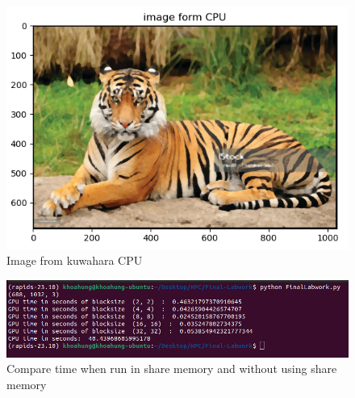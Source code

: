 \documentclass{article}
\begin{document}
\begin{figure}[b]
\begin{center}
   \includegraphics[scale=0.7]{image_from_cpu.png}
\end{center}
\caption{Image from kuwahara CPU}
\end{figure}

\begin{figure}[b]
\begin{center}
   \includegraphics[scale=0.5]{result_process.png}
\end{center}
\caption{Compare time when run in share memory and without using share memory }
\end{figure}
\end{document}
